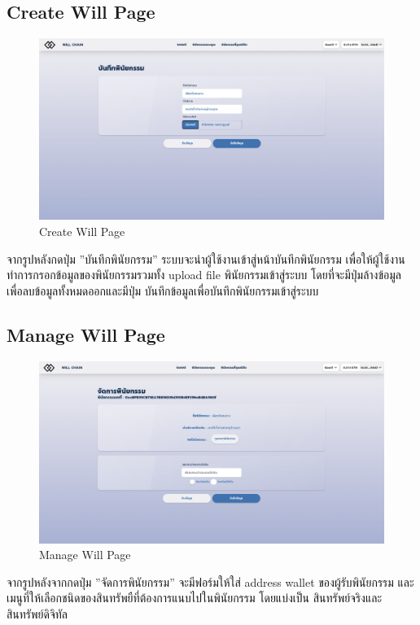 \documentclass[12pt,oneside,openright,a4paper]{cpe-thai-project}
\begin{document}
\subsection{Create Will Page }
	\begin{figure}[!thb]
			\centering
			\includegraphics[scale=0.2]{mintWill4}
			\caption{Create Will Page}
		\end{figure}
		\FloatBarrier
\tab จากรูปหลังกดปุ่ม ''บันทึกพินัยกรรม'' ระบบจะนำผู้ใช้งานเข้าสู่หน้าบันทึกพินัยกรรม เพื่อให้ผู้ใช้งานทำการกรอกข้อมูลของพินัยกรรมรวมทั้ง upload file พินัยกรรมเข้าสู่ระบบ โดยที่จะมีปุ่มล้างข้อมูลเพื่อลบข้อมูลทั้งหมดออกและมีปุ่ม บันทึกข้อมูลเพื่อบันทึกพินัยกรรมเข้าสู่ระบบ

\subsection{Manage Will Page}
	\begin{figure}[!thb]
			\centering
			\includegraphics[scale=0.2]{manageWill4}
			\caption{Manage Will Page}
		\end{figure}
		\FloatBarrier
\tab จากรูปหลังจากกดปุ่ม ''จัดการพินัยกรรม'' จะมีฟอร์มให้ใส่ address wallet ของผู้รับพินัยกรรม และ เมนูที่ให้เลือกชนิดของสินทรัพยืที่ต้องการแนบไปในพินัยกรรม โดยแบ่งเป็น สินทรัพย์จริงและสินทรัพย์ดิจิทัล 
\end{document}
